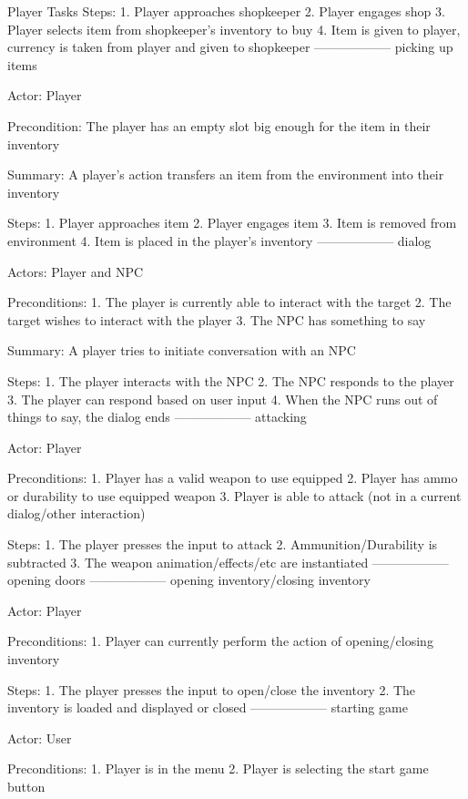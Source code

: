\documentclass[12pt]{report}
\begin{document}
\begin{section}{Player Tasks}
Steps: 
1. Player approaches shopkeeper
2. Player engages shop
3. Player selects item from shopkeeper's inventory to buy
4. Item is given to player, currency is taken from player and given to shopkeeper
------------------
picking up items %

Actor: Player

Precondition: The player has an empty slot big enough for the item in their inventory

Summary: A player's action transfers an item from the environment into their inventory

Steps:
1. Player approaches item
2. Player engages item
3. Item is removed from environment
4. Item is placed in the player's  inventory
------------------
dialog %

Actors: Player and NPC

Preconditions:
1. The player is currently able to interact with the target
2. The target wishes to interact with the player
3. The NPC has something to say

Summary: A player tries to initiate conversation with an NPC

Steps:
1. The player interacts with the NPC
2. The NPC responds to the player
3. The player can respond based on user input
4. When the NPC runs out of things to say, the dialog ends
------------------
attacking %

Actor: Player

Preconditions:
1. Player has a valid weapon to use equipped
2. Player has ammo or durability to use equipped weapon
3. Player is able to attack (not in a current dialog/other interaction)

Steps:
1. The player presses the input to attack
2. Ammunition/Durability is subtracted
3. The weapon animation/effects/etc are instantiated
------------------
opening doors
------------------
opening inventory/closing inventory %

Actor: Player

Preconditions: 
1. Player can currently perform the action of opening/closing inventory

Steps:
1. The player presses the input to open/close the inventory
2. The inventory is loaded and displayed or closed 
------------------
starting game %

Actor: User

Preconditions: 
1. Player is in the menu
2. Player is selecting the start game button


\end{section}
\end{document}
